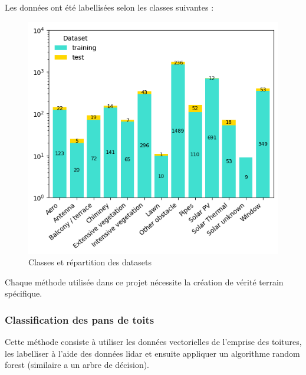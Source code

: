 \par{Les données ont été labellisées selon les classes suivantes :}
\begin{figure}[H]
    \centering
    \includegraphics[width=1\linewidth]{02-main//figures/ch2/stdl_03_classes.png}
    \caption{Classes et répartition des datasets}
    \label{fig:stdl_03_classes}
\end{figure}
\par{Chaque méthode utilisée dans ce projet nécessite la création de vérité terrain spécifique.}

\subsubsection{Classification des pans de toits}
\par{Cette méthode consiste à utiliser les données vectorielles de l'emprise des toitures, les labelliser à l'aide des données \gls{lidar} et ensuite appliquer un algorithme random forest (similaire a un arbre de décision).}

